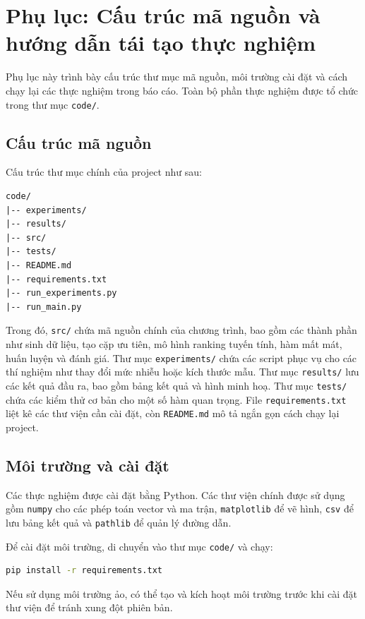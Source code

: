\section{Phụ lục: Cấu trúc mã nguồn và hướng dẫn tái tạo thực nghiệm}
\label{appendix:reproducibility}

Phụ lục này trình bày cấu trúc thư mục mã nguồn, môi trường cài đặt và cách chạy lại các thực nghiệm trong báo cáo. Toàn bộ phần thực nghiệm được tổ chức trong thư mục \texttt{code/}.

\subsection{Cấu trúc mã nguồn}

Cấu trúc thư mục chính của project như sau:

\begin{lstlisting}
code/
|-- experiments/
|-- results/
|-- src/
|-- tests/
|-- README.md
|-- requirements.txt
|-- run_experiments.py
|-- run_main.py
\end{lstlisting}

Trong đó, \texttt{src/} chứa mã nguồn chính của chương trình, bao gồm các thành phần như sinh dữ liệu, tạo cặp ưu tiên, mô hình ranking tuyến tính, hàm mất mát, huấn luyện và đánh giá. Thư mục \texttt{experiments/} chứa các script phục vụ cho các thí nghiệm như thay đổi mức nhiễu hoặc kích thước mẫu. Thư mục \texttt{results/} lưu các kết quả đầu ra, bao gồm bảng kết quả và hình minh hoạ. Thư mục \texttt{tests/} chứa các kiểm thử cơ bản cho một số hàm quan trọng. File \texttt{requirements.txt} liệt kê các thư viện cần cài đặt, còn \texttt{README.md} mô tả ngắn gọn cách chạy lại project.

\subsection{Môi trường và cài đặt}

Các thực nghiệm được cài đặt bằng Python. Các thư viện chính được sử dụng gồm \texttt{numpy} cho các phép toán vector và ma trận, \texttt{matplotlib} để vẽ hình, \texttt{csv} để lưu bảng kết quả và \texttt{pathlib} để quản lý đường dẫn.

Để cài đặt môi trường, di chuyển vào thư mục \texttt{code/} và chạy:

\begin{lstlisting}[language=bash]
pip install -r requirements.txt
\end{lstlisting}

Nếu sử dụng môi trường ảo, có thể tạo và kích hoạt môi trường trước khi cài đặt thư viện để tránh xung đột phiên bản.


